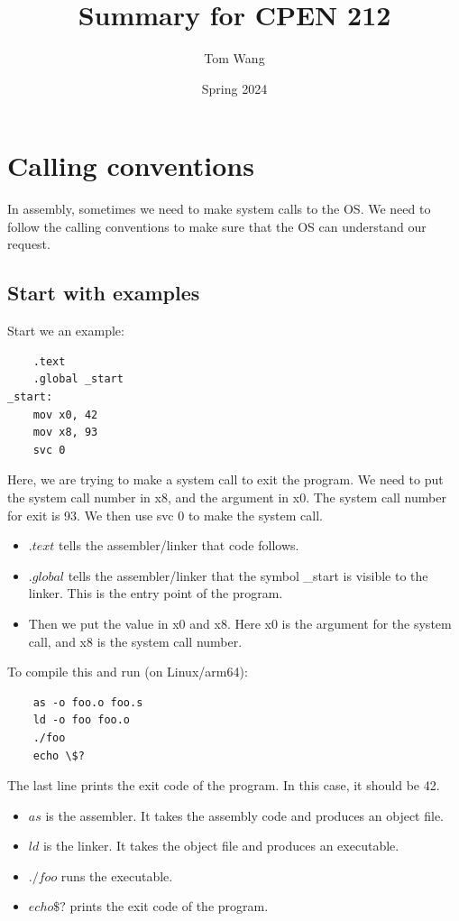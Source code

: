 \documentclass[letterpaper,12pt]{article}
\title{Summary for CPEN 212}
\author{Tom Wang}
\date{Spring 2024}
\begin{document}
\maketitle
\section{Calling conventions}
In assembly, sometimes we need to make system calls to the OS. We need to
follow the calling conventions to make sure that the OS can understand our
request.

\subsection{Start with examples}
Start we an example: \begin{lstlisting}
    .text
    .global _start
_start:
    mov x0, 42
    mov x8, 93
    svc 0
\end{lstlisting}
Here, we are trying to make a system call to exit the program. We need to put
the system call number in x8, and the argument in x0. The system call number
for exit is 93. We then use svc 0 to make the system call.

\begin{itemize}
    \item $.text$ tells the assembler/linker that code follows.
    \item $.global$ tells the assembler/linker that the symbol \_start is visible to the linker. This is the entry point of the program.
    \item Then we put the value in x0 and x8. Here x0 is the argument for the system
          call, and x8 is the system call number.
\end{itemize}

To compile this and run (on Linux/arm64): \begin{lstlisting}
    as -o foo.o foo.s
    ld -o foo foo.o
    ./foo
    echo \$?
\end{lstlisting}
The last line prints the exit code of the program. In this case, it should be
42.
\begin{itemize}
    \item $as$ is the assembler. It takes the assembly code and produces an object file.
    \item $ld$ is the linker. It takes the object file and produces an executable.
    \item $./foo$ runs the executable.
    \item $echo \$?$ prints the exit code of the program.
\end{itemize}
\end{document}
